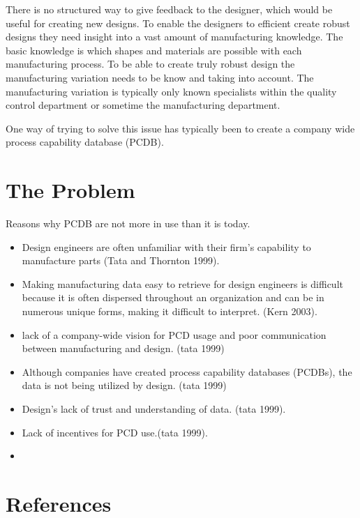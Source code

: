 \documentclass[aip,amsmath,reprint, author-year]{revtex4-1}
\begin{document}
 

 
There is no structured way to give feedback to the designer, which would be useful for creating new designs. 
To enable the designers to efficient create robust designs they need insight into a vast amount of manufacturing knowledge. 
The basic knowledge is which shapes and materials are possible with each manufacturing process. 
To be able to create truly robust design the manufacturing variation needs to be know and taking into account. The manufacturing variation is typically only known specialists within the quality control department or sometime the manufacturing department. 



One way of trying to solve this issue has typically been to create a company wide process capability database (PCDB). 

\section{The Problem}

Reasons why PCDB are not more in use than it is today.

\begin{itemize}

\item{Design engineers are often unfamiliar with their firm’s capability to manufacture parts (Tata and Thornton 1999).}
\item{Making manufacturing data easy to retrieve for design engineers is difficult because it is often dispersed throughout an organization and can be in numerous unique forms, making it difficult to interpret. (Kern 2003).}
\item{lack of a company-wide vision for PCD usage and poor communication between manufacturing and design. (tata 1999)}
\item{Although companies have created process capability databases (PCDBs), the data is not being utilized by design. (tata 1999)}
\item{Design’s lack of trust and understanding of data. (tata 1999).}
\item{Lack of incentives for PCD use.(tata 1999).}

\item{}

\end{itemize} 



\section*{References}

\end{document}
